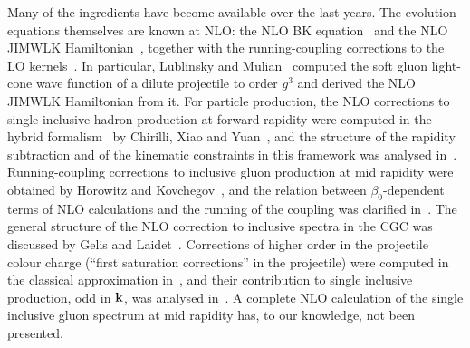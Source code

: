 Many of the ingredients have become available over the last years. The evolution equations themselves are known at NLO: the NLO BK equation~\cite{Balitsky:2007feb} and the NLO JIMWLK Hamiltonian~\cite{Balitsky:2013fea,Kovner:2013ona,Kovner:2014lca,Grabovsky:2013mba}, together with the running-coupling corrections to the LO kernels~\cite{Balitsky:2006wa,Kovchegov:2006vj,Kovchegov:2006wf}. In particular, Lublinsky and Mulian~\cite{Lublinsky:2016meo} computed the soft gluon light-cone wave function of a dilute projectile to order $g^3$ and derived the NLO JIMWLK Hamiltonian from it. For particle production, the NLO corrections to single inclusive hadron production at forward rapidity were computed in the hybrid formalism~\cite{Dumitru:2005gt,Altinoluk:2011qy} by Chirilli, Xiao and Yuan~\cite{Chirilli:2011km,Chirilli:2012jd}, and the structure of the rapidity subtraction and of the kinematic constraints in this framework was analysed in~\cite{Stasto:2013cha,Altinoluk:2014eka,Ducloue:2016shw}. Running-coupling corrections to inclusive gluon production at mid rapidity were obtained by Horowitz and Kovchegov~\cite{Horowitz:2010yg}, and the relation between $\beta_0$-dependent terms of NLO calculations and the running of the coupling was clarified in~\cite{Kovner:2023vsy}. The general structure of the NLO correction to inclusive spectra in the CGC was discussed by Gelis and Laidet~\cite{Gelis:2012ri}. Corrections of higher order in the projectile colour charge (``first saturation corrections'' in the projectile) were computed in the classical approximation in~\cite{Chirilli:2015tea,Li:2021zmf,Li:2021ntm}, and their contribution to single inclusive production, odd in $\mathbf{k}$, was analysed in~\cite{McLerran:2016snu,Kovchegov:2018jun}. A complete NLO calculation of the single inclusive gluon spectrum at mid rapidity has, to our knowledge, not been presented.


